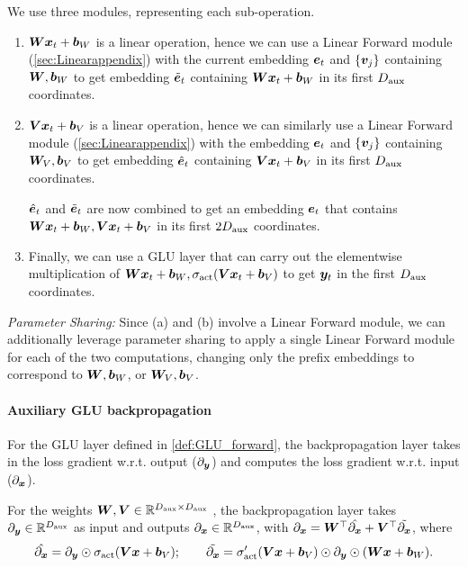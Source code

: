 We use three \simulator{} modules, representing each sub-operation.
\begin{enumerate}[label=(\alph*)]
    \item ${\bm{W}} {\bm{x}}_t + {\bm{b}}_W$ is a linear operation, hence we can use a \simulator{} Linear Forward module (\cref{sec:Linearappendix}) with the current embedding $\ve_t$ and  $\{{\bm{v}}_j\}$ containing ${\bm{W}}, {\bm{b}}_W$ to get embedding $\Tilde{\ve}_t$ containing ${\bm{W}} {\bm{x}}_t + {\bm{b}}_W$ in its first $D_{\text{aux}}$ coordinates.

    \item  ${\bm{V}} {\bm{x}}_t + {\bm{b}}_V$ is a linear operation, hence we can similarly use a \simulator{} Linear Forward module (\cref{sec:Linearappendix}) with the embedding $\ve_t$ and  $\{{\bm{v}}_j\}$ containing ${\bm{W}}_V, {\bm{b}}_V$ to get embedding $\Hat{\ve}_t$ containing ${\bm{V}} {\bm{x}}_t + {\bm{b}}_V$ in its first $D_{\text{aux}}$ coordinates. 
    
    $\Hat{\ve}_t$ and $\Tilde{\ve}_t$ are now combined to get an embedding $\ve_t$ that contains ${\bm{W}} {\bm{x}}_t + {\bm{b}}_W, {\bm{V}} {\bm{x}}_t + {\bm{b}}_V$
    in its first $2 D_{\text{aux}}$ coordinates.

    \item Finally, we can use a \simulator{} GLU layer that can carry out the elementwise multiplication of ${\bm{W}} {\bm{x}}_t + {\bm{b}}_W, \sigma_{\textrm{act}}({\bm{V}} {\bm{x}}_t + {\bm{b}}_V)$ to get ${\bm{y}}_t$ in the first $D_{\text{aux}}$ coordinates.
\end{enumerate}

\textit{Parameter Sharing:} Since (a) and (b) involve a Linear Forward
module, we can additionally leverage parameter sharing to apply a single Linear Forward module for each of the two computations, changing only the prefix embeddings to correspond to ${\bm{W}}, {\bm{b}}_W$, or ${\bm{W}}_V, {\bm{b}}_V$.


\paragraph{Auxiliary GLU backpropagation}
For the GLU layer defined in \cref{def:GLU_forward}, the backpropagation layer takes in the loss gradient w.r.t. output ($\partial_{{\bm{y}}}$) and computes the loss gradient  w.r.t. input ($\partial_{{\bm{x}}}$).

\begin{definition}\label{def:glu_backprop}
    For the weights ${\bm{W}}, {\bm{V}} \in\mathbb{R}^{ D_{\text{aux}}  \times D_{\text{aux}} }$ , the backpropagation layer takes $\partial_{ {\bm{y}} } \in\mathbb{R}^{ D_{\text{aux}} }$ as input and outputs $\partial_{{\bm{x}}} \in\mathbb{R}^{ D_{\text{aux}} }$, with $\partial_{{\bm{x}}} = {\bm{W}}^{\top} \Hat{\partial_{{\bm{x}}}} + {\bm{V}}^{\top} \Tilde{\partial_{{\bm{x}}}}$, where
    \begin{align*}
        \Hat{\partial_{{\bm{x}}}} =  \partial_{{\bm{y}}} \odot \sigma_{\textrm{act}}( {\bm{V}} {\bm{x}} + {\bm{b}}_V ); \qquad
        \Tilde{\partial_{{\bm{x}}}} =   \sigma_{\textrm{act}}'( {\bm{V}} {\bm{x}} + {\bm{b}}_V  ) \odot \partial_{{\bm{y}}} \odot ({\bm{W}} {\bm{x}} + {\bm{b}}_W)  .
    \end{align*}
\end{definition}


